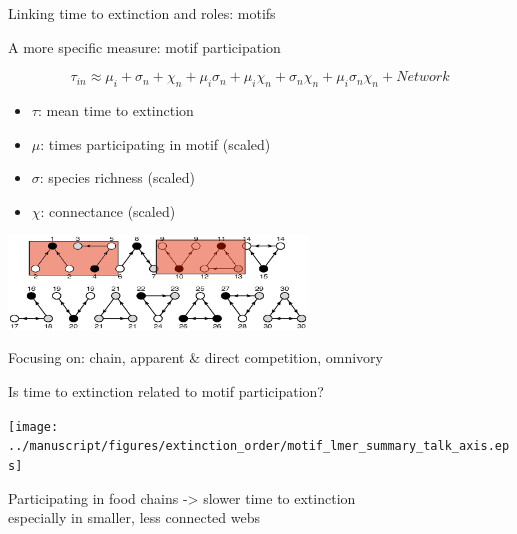 \documentclass{beamer}
\begin{document}
  \begin{frame}{Linking time to extinction and roles: motifs}

    A more specific measure: motif participation

    \vspace{-0.4cm}
    {\color{DarkBlue}
    \begin{equation*}
    \tau_{in} \approx \mu_i + \sigma_n + \chi_n + \mu_{i}\sigma_{n} + \mu_{i}\chi_{n} + \sigma_{n}\chi_{n} + \mu_{i}\sigma_{n}\chi_{n} + Network
    \end{equation*}
    }
    \vspace{-0.4cm}
    \begin{itemize}
      \item $\tau$: mean time to extinction
      \item $\mu$: times participating in motif (scaled)
      \item $\sigma$: species richness (scaled)
      \item $\chi$: connectance (scaled)
    \end{itemize}

    \begin{centering}

      \includegraphics[height=2.5cm]{intro_figs/stable_motifs_and_positions.eps}

    \end{centering}

    {\color{DarkBlue}Focusing on: chain, apparent \& direct competition, omnivory}

    \end{frame}

  \begin{frame}{Is time to extinction related to motif participation?}

    \begin{centering}

      \texttt{[image: ../manuscript/figures/extinction\_order/motif\_lmer\_summary\_talk\_axis.eps]}
    
    \end{centering}

    {\color{white}Participating in food chains -> slower time to extinction\\
    especially in smaller, less connected webs}

    \end{frame}
\end{document}
